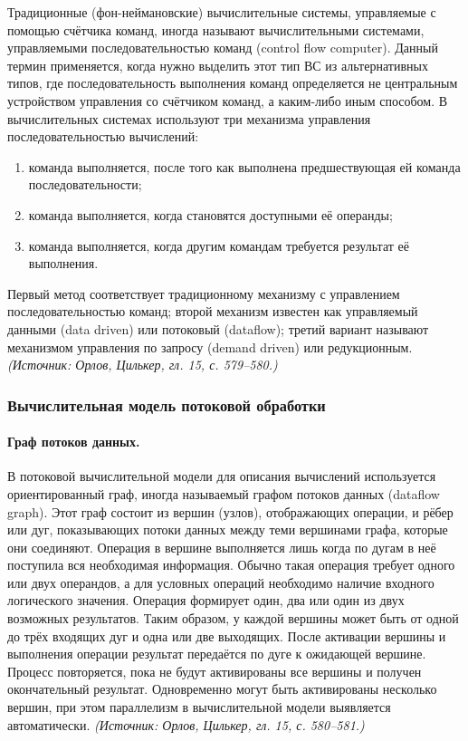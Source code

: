 \documentclass[a4paper,12pt]{article}
\begin{document}
Традиционные (фон-неймановские) вычислительные системы, управляемые с помощью счётчика команд, иногда называют вычислительными системами, управляемыми последовательностью команд (control flow computer). Данный термин применяется, когда нужно выделить этот тип ВС из альтернативных типов, где последовательность выполнения команд определяется не центральным устройством управления со счётчиком команд, а каким-либо иным способом. В вычислительных системах используют три механизма управления последовательностью вычислений:
\begin{enumerate}[label=\arabic*)]
\item команда выполняется, после того как выполнена предшествующая ей команда последовательности;
\item команда выполняется, когда становятся доступными её операнды;
\item команда выполняется, когда другим командам требуется результат её выполнения.
\end{enumerate}
Первый метод соответствует традиционному механизму с управлением последовательностью команд; второй механизм известен как управляемый данными (data driven) или потоковый (dataflow); третий вариант называют механизмом управления по запросу (demand driven) или редукционным.
\textit{(Источник: Орлов, Цилькер, гл. 15, с. 579--580.)}

\subsubsection{Вычислительная модель потоковой обработки}

\paragraph{Граф потоков данных.}
В потоковой вычислительной модели для описания вычислений используется ориентированный граф, иногда называемый графом потоков данных (dataflow graph). Этот граф состоит из вершин (узлов), отображающих операции, и рёбер или дуг, показывающих потоки данных между теми вершинами графа, которые они соединяют. Операция в вершине выполняется лишь когда по дугам в неё поступила вся необходимая информация. Обычно такая операция требует одного или двух операндов, а для условных операций необходимо наличие входного логического значения. Операция формирует один, два или один из двух возможных результатов. Таким образом, у каждой вершины может быть от одной до трёх входящих дуг и одна или две выходящих. После активации вершины и выполнения операции результат передаётся по дуге к ожидающей вершине. Процесс повторяется, пока не будут активированы все вершины и получен окончательный результат. Одновременно могут быть активированы несколько вершин, при этом параллелизм в вычислительной модели выявляется автоматически.
\textit{(Источник: Орлов, Цилькер, гл. 15, с. 580--581.)}
\end{document}
